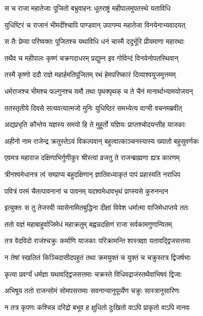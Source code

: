 \twolineshloka
{स च राजा महातेजाः पूजितो बभ्रुवाहनः}
{धूतराष्ट्रं महीपालमुपतस्थे यताविधि}


\twolineshloka
{युधिष्टिरं च राजानं भीमदींश्चापि पाण्डवान्}
{उपागम्य महातेजा विनयेनाभ्यवादयत्}


\twolineshloka
{स तैः प्रेम्या परिष्वक्तः पूजितश्च यथाविधि}
{धनं चास्मै ददुर्भूरि प्रीयमाणा महारथाः}


\twolineshloka
{तथैव च महीपालः कृष्णं चक्रगदाधरम्}
{प्रद्युम्न इव गोविन्दं विनयेनोपतस्थिवान्}


\twolineshloka
{तस्मै कृष्णो ददौ राज्ञे महार्हमतिपूजितम्}
{रथं हेमपरिष्कारं दिव्याश्वयुजमुत्तमम्}


\twolineshloka
{धर्मराजश्च भीमश्च फल्गुनश्च यमौ तथा}
{पृथक्पृथक् च ते चैनं मानार्थाभ्यामयोजयन्}


\twolineshloka
{ततस्तृतीये दिवसे सत्यवत्यात्मजो मुनिः}
{युधिष्ठिरं समभ्येत्य वाग्मी वचनमब्रवीत्}


\twolineshloka
{अद्यप्रभृति कौन्तेय यज्ञस्य समयो हि ते}
{मुहूर्तो यज्ञियः प्राप्तश्चोदयन्तीह याजकाः}


\twolineshloka
{अहीनो नाम राजेन्द्र क्रतुस्तेऽयं विकल्पवान्}
{बहुत्वात्काञ्चनस्यास्य ख्यातो बहुसुवर्णकः}


\twolineshloka
{एवमत्र महाराज दक्षिणाभिर्गुणीकुर}
{श्रीस्त्वां व्रजतु ते राजन्ब्राह्मणा ह्यत्र कारणम्}


\twolineshloka
{त्रीनश्वमेधानत्र त्वं सम्प्राप्य बहुदक्षिणान्}
{ज्ञातिवध्याकृतं पापं प्रहास्यति नराधिप}


\twolineshloka
{पवित्रं परमं चैतत्पावनानां च पावनम्}
{यदश्वमेधावभृथं प्राप्स्यसे कुरुनन्दन}


\twolineshloka
{इत्युक्तः स तु तेजस्वी व्यासेनामितबुद्धिना}
{दीक्षां विवेश धर्मात्मा वाजिमेधाप्तये ततः}


\twolineshloka
{ततो यज्ञं महाबाहुर्वाजिमेधं महाक्रतुम्}
{बह्वन्नदक्षिणं राजा सर्वकामगुणान्वितम्}


\twolineshloka
{तत्र वेदविदो राजंश्चक्रुः कर्माणि याजकाः}
{परिक्रामन्ति शास्त्रज्ञा यतावद्द्विजसत्तमाः}


\twolineshloka
{न तेषां स्खलितं किञ्चिदासीदपहुतं तथा}
{क्रमयुक्तं च युक्तं च चक्रुस्तत्र द्विजर्षभाः}


\twolineshloka
{कृत्वा प्रवर्ग्यं धर्मज्ञा यथावद्द्विजसत्तमाः}
{चक्रस्ते विधिवद्राजंस्तथैवाभिषवं द्विजाः}


\twolineshloka
{अभिषूय ततो राजन्सोमं सोमपसत्तमाः}
{सवनान्यानुपूर्व्येण चक्रुः सास्त्रानुसारिणः}


\twolineshloka
{न तत्र कृपणः कश्चिन्न दरिद्रो बभूव ह}
{क्षुधितो दुःखितो वाऽपि प्राकृतो वाऽपि मानवः}



